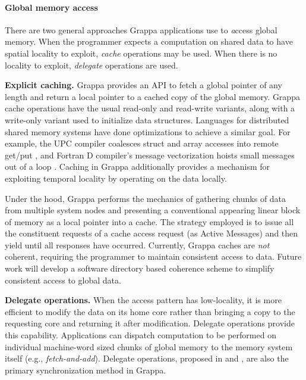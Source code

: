 \paragraph{Global memory access} There are two general approaches Grappa applications use to {\emph access} global memory. When the programmer expects a computation on shared data to have spatial locality to exploit, {\em cache} operations may be used. When there is no locality to exploit, {\em delegate} operations are used.

\textbf{Explicit caching.} Grappa provides an API to fetch a global pointer of any length and return a local pointer to a cached copy of the global memory.  Grappa cache operations have the usual read-only and read-write variants, along with a write-only variant used to initialize data structures. Languages for distributed shared memory systems have done optimizations to achieve a similar goal. For example, the UPC compiler coalesces struct and array accesses into remote get/put \cite{Chen:2005}, and Fortran D compiler's message vectorization hoists small messages out of a loop \cite{FortranD:1992}. Caching in Grappa additionally provides a mechanism for exploiting temporal locality by operating on the data locally.

Under the hood, Grappa performs the mechanics of gathering chunks of data from multiple system nodes and presenting a conventional appearing linear block of memory as a local pointer into a cache. The strategy employed is to issue all the constituent requests of a cache access request  (as Active Messages) and then yield until all responses have occurred.  Currently, Grappa caches are \emph{not} coherent, requiring the programmer to maintain consistent access to data.  Future work will develop a software directory based coherence scheme to simplify consistent access to global data.

\textbf{Delegate operations.} When the access pattern has low-locality, it is more efficient to modify the data on its home core rather than bringing a copy to the requesting core and returning it after modification. Delegate operations provide this capability. Applications can dispatch computation to be performed on individual machine-word sized chunks of global memory to the memory system itself (e.g., \emph{fetch-and-add}).  Delegate operations, proposed in \cite{Nelson:hotpar11} and \cite{delegated:oopsla11}, are also the primary synchronization method in Grappa.

